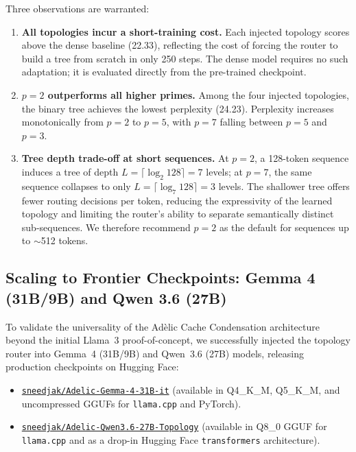 \documentclass[11pt,a4paper]{article}
\begin{document}
Three observations are warranted:

\begin{enumerate}
    \item \textbf{All topologies incur a short-training cost.} Each injected topology scores above the dense baseline (22.33), reflecting the cost of forcing the router to build a tree from scratch in only 250 steps. The dense model requires no such adaptation; it is evaluated directly from the pre-trained checkpoint.

    \item \textbf{$p = 2$ outperforms all higher primes.} Among the four injected topologies, the binary tree achieves the lowest perplexity (24.23). Perplexity increases monotonically from $p = 2$ to $p = 5$, with $p = 7$ falling between $p = 5$ and $p = 3$.

    \item \textbf{Tree depth trade-off at short sequences.} At $p = 2$, a 128-token sequence induces a tree of depth $L = \lceil \log_2 128 \rceil = 7$ levels; at $p = 7$, the same sequence collapses to only $L = \lceil \log_7 128 \rceil = 3$ levels. The shallower tree offers fewer routing decisions per token, reducing the expressivity of the learned topology and limiting the router's ability to separate semantically distinct sub-sequences. We therefore recommend $p = 2$ as the default for sequences up to $\sim$512 tokens.
\end{enumerate}

\subsection{Scaling to Frontier Checkpoints: Gemma 4 (31B/9B) and Qwen 3.6 (27B)}
\label{sec:scaling}

To validate the universality of the Ad\`elic Cache Condensation architecture beyond the initial Llama~3 proof-of-concept, we successfully injected the topology router into Gemma~4 (31B/9B) and Qwen~3.6 (27B) models, releasing production checkpoints on Hugging Face:
\begin{itemize}
    \item \href{https://huggingface.co/sneedjak/Adelic-Gemma-4-31B-it}{\texttt{sneedjak/Adelic-Gemma-4-31B-it}} (available in Q4\_K\_M, Q5\_K\_M, and uncompressed GGUFs for \texttt{llama.cpp} and PyTorch).
    \item \href{https://huggingface.co/sneedjak/Adelic-Qwen3.6-27B-Topology}{\texttt{sneedjak/Adelic-Qwen3.6-27B-Topology}} (available in Q8\_0 GGUF for \texttt{llama.cpp} and as a drop-in Hugging Face \texttt{transformers} architecture).
\end{itemize}
\end{document}
